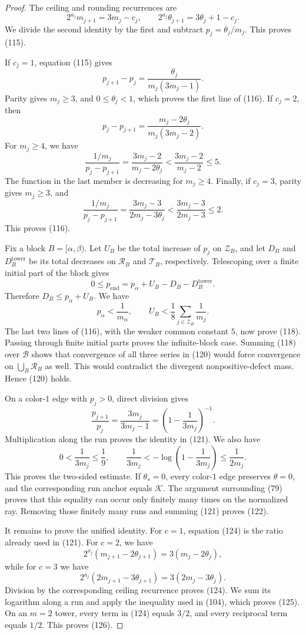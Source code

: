 \documentclass[11pt]{article}
\begin{document}
\begin{proof}
The ceiling and rounding recurrences are
\[
  2^{a_j}m_{j+1}=3m_j-c_j,
  \qquad
  2^{a_j}\theta_{j+1}=3\theta_j+1-c_j.
\]
We divide the second identity by the first and subtract
$p_j=\theta_j/m_j$.  This proves (115).

If $c_j=1$, equation (115) gives
\[
  p_{j+1}-p_j=\frac{\theta_j}{m_j(3m_j-1)}.
\]
Parity gives $m_j\geq3$, and $0\leq\theta_j<1$, which proves the first
line of (116).  If $c_j=2$, then
\[
  p_j-p_{j+1}=\frac{m_j-2\theta_j}{m_j(3m_j-2)}.
\]
For $m_j\geq4$, we have
\[
  \frac{1/m_j}{p_j-p_{j+1}}
  =\frac{3m_j-2}{m_j-2\theta_j}
  <\frac{3m_j-2}{m_j-2}\leq5.
\]
The function in the last member is decreasing for $m_j\geq4$.  Finally,
if $c_j=3$, parity gives $m_j\geq3$, and
\[
  \frac{1/m_j}{p_j-p_{j+1}}
  =\frac{3m_j-3}{2m_j-3\theta_j}
  <\frac{3m_j-3}{2m_j-3}\leq2.
\]
This proves (116).

Fix a block $B=[\alpha,\beta)$.  Let $U_B$ be the total increase of $p_j$
on $\mathcal Z_B$, and let $D_B$ and $D_B^{\mathrm{tower}}$ be its total
decreases on $\mathcal R_B$ and $\mathcal T_B$, respectively.  Telescoping
over a finite initial part of the block gives
\[
  0\leq p_{\mathrm{end}}
  =p_\alpha+U_B-D_B-D_B^{\mathrm{tower}}.
\]
Therefore $D_B\leq p_\alpha+U_B$.  We have
\[
  p_\alpha<\frac1{m_\alpha},
  \qquad
  U_B<\frac18\sum_{j\in\mathcal Z_B}\frac1{m_j}.
\]
The last two lines of (116), with the weaker common constant $5$, now prove
(118).  Passing through finite initial parts proves the infinite-block
case.  Summing (118) over $\mathcal B$ shows that convergence of all three
series in (120) would force convergence on $\bigcup_B\mathcal R_B$ as well.
This would contradict the divergent nonpositive-defect mass.  Hence (120)
holds.

On a color-$1$ edge with $p_j>0$, direct division gives
\[
  \frac{p_{j+1}}{p_j}
  =\frac{3m_j}{3m_j-1}
  =\left(1-\frac1{3m_j}\right)^{-1}.
\]
Multiplication along the run proves the identity in (121).  We also have
\[
  0<\frac1{3m_j}\leq\frac19,
  \qquad
  \frac1{3m_j}
  <-\log\left(1-\frac1{3m_j}\right)
  \leq\frac1{2m_j}.
\]
This proves the two-sided estimate.  If $\theta_s=0$, every color-$1$ edge
preserves $\theta=0$, and the corresponding run anchor equals
$\mathcal K$.  The argument surrounding (79) proves that this equality can
occur only finitely many times on the normalized ray.  Removing those
finitely many runs and summing (121) proves (122).

It remains to prove the unified identity.  For $c=1$, equation (124) is the
ratio already used in (121).  For $c=2$, we have
\[
  2^{a_j}(m_{j+1}-2\theta_{j+1})=3(m_j-2\theta_j),
\]
while for $c=3$ we have
\[
  2^{a_j}(2m_{j+1}-3\theta_{j+1})
  =3(2m_j-3\theta_j).
\]
Division by the corresponding ceiling recurrence proves (124).  We sum
its logarithm along a run and apply the inequality used in (104), which
proves (125).  On an $m=2$ tower, every term in (124) equals $3/2$, and
every reciprocal term equals $1/2$.  This proves (126).
\end{proof}
\end{document}
